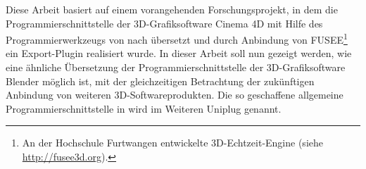 \label{sec:Frage}

Diese Arbeit basiert auf einem vorangehenden Forschungsprojekt, in dem die Programmierschnittstelle der 3D-Grafiksoftware Cinema 4D mit Hilfe des Programmierwerkzeugs  von \CC nach \CS übersetzt und durch Anbindung von FUSEE\footnote{An der Hochschule Furtwangen entwickelte 3D-Echtzeit-Engine (siehe \url{http://fusee3d.org}).} ein Export-Plugin realisiert wurde.
In dieser Arbeit soll nun gezeigt werden, wie eine ähnliche Übersetzung der Programmierschnittstelle der 3D-Grafiksoftware Blender möglich ist, mit der gleichzeitigen Betrachtung der zukünftigen Anbindung von weiteren 3D-Softwareprodukten. Die so geschaffene allgemeine Programmierschnittstelle in \CS wird im Weiteren Uniplug genannt.


